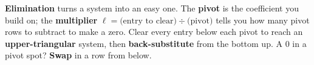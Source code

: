 \documentclass[10pt]{article}
\begin{document}
\vspace{0.10in}

\begin{remindbox}
\small \textbf{Elimination} turns a system into an easy one. The \textbf{pivot} is the coefficient
you build on; the \textbf{multiplier} $\ell = \text{(entry to clear)} \div \text{(pivot)}$ tells you
how many pivot rows to subtract to make a zero. Clear every entry below each pivot to reach an
\textbf{upper-triangular} system, then \textbf{back-substitute} from the bottom up. A $0$ in a pivot
spot? \textbf{Swap} in a row from below.
\end{remindbox}
\end{document}
